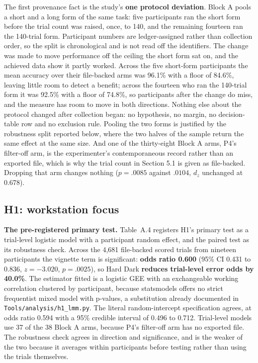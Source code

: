 The first provenance fact is the study's \textbf{one protocol deviation}. Block A pools a short and a long form of
the same task: five participants ran the short form before the trial count was raised, once, to 140,
and the remaining fourteen ran the 140-trial form. Participant numbers are ledger-assigned rather
than collection order, so the split is chronological and is not read off the identifiers. The change was made to move performance off the ceiling the short form sat on, and the achieved
data show it partly worked. Across the five short-form participants the mean accuracy over their file-backed arms was 96.1\%
with a floor of 84.6\%, leaving little room to detect a benefit; across the fourteen who ran the 140-trial
form it was 92.5\% with a floor of 74.8\%, so participants after the change do miss, and the measure
has room to move in both directions. Nothing
else about the protocol changed after collection began: no hypothesis, no margin, no decision-table
row and no exclusion rule. Pooling the two forms is justified by the robustness split
reported below, where the two halves of the sample return the same effect at the same size. And one
of the thirty-eight Block A arms, P4's filter-off arm, is the experimenter's contemporaneous record
rather than an exported
file, which is why the trial count in Section 5.1 is given as file-backed. Dropping that arm changes
nothing ($p = .0085$ against $.0104$, $d_z$ unchanged at 0.678).

\subsection{H1: workstation focus}

\textbf{The pre-registered primary test.} Table~A.4 registers H1's primary test as a trial-level
logistic model with a participant random effect, and the paired test as its robustness
check. Across the 4,681 file-backed scored trials from nineteen participants the vignette term is
significant: \textbf{odds ratio 0.600} (95\% CI 0.431 to 0.836, $z = -3.020$, $p = .0025$), so Hard
Dark \textbf{reduces trial-level error odds by 40.0\%}. The estimator fitted is a logistic GEE with
an exchangeable working correlation clustered by participant, because statsmodels offers no strict
frequentist mixed model with p-values, a substitution already documented in
\texttt{Tools/analysis/h1\_lmm.py}. The literal random-intercept specification agrees, at odds
ratio 0.594 with a 95\% credible interval of 0.496 to 0.712. Trial-level models use 37 of the 38
Block A arms, because P4's filter-off arm has no exported file. The robustness check agrees in
direction and significance, and is the weaker of the two because it averages within participants
before testing rather than using the trials themselves.

